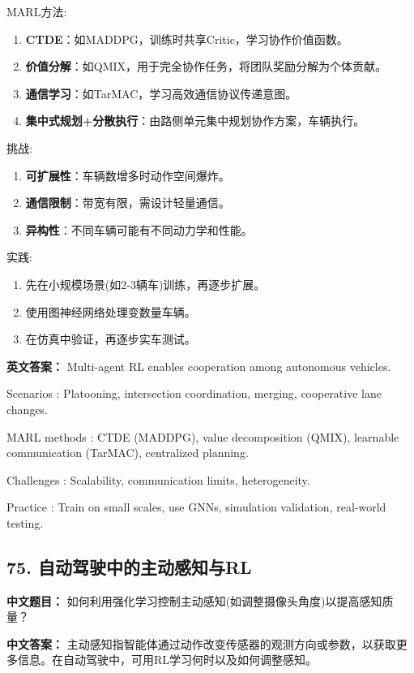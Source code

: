 \documentclass[10pt,a4paper]{ctexart}
\begin{document}
 MARL方法:
\begin{enumerate}
    \item \textbf{CTDE}：如MADDPG，训练时共享Critic，学习协作价值函数。
    \item \textbf{价值分解}：如QMIX，用于完全协作任务，将团队奖励分解为个体贡献。
    \item \textbf{通信学习}：如TarMAC，学习高效通信协议传递意图。
    \item \textbf{集中式规划+分散执行}：由路侧单元集中规划协作方案，车辆执行。
\end{enumerate}

 挑战:
\begin{enumerate}
    \item \textbf{可扩展性}：车辆数增多时动作空间爆炸。
    \item \textbf{通信限制}：带宽有限，需设计轻量通信。
    \item \textbf{异构性}：不同车辆可能有不同动力学和性能。
\end{enumerate}

 实践:
\begin{enumerate}
    \item 先在小规模场景(如2-3辆车)训练，再逐步扩展。
    \item 使用图神经网络处理变数量车辆。
    \item 在仿真中验证，再逐步实车测试。
\end{enumerate}

\textbf{英文答案：}  
Multi-agent RL enables cooperation among autonomous vehicles.

 Scenarios : Platooning, intersection coordination, merging, cooperative lane changes.

 MARL methods : CTDE (MADDPG), value decomposition (QMIX), learnable communication (TarMAC), centralized planning.

 Challenges : Scalability, communication limits, heterogeneity.

 Practice : Train on small scales, use GNNs, simulation validation, real-world testing.

\subsection*{75. 自动驾驶中的主动感知与RL}
\textbf{中文题目：} 如何利用强化学习控制主动感知(如调整摄像头角度)以提高感知质量？

\textbf{中文答案：}  
主动感知指智能体通过动作改变传感器的观测方向或参数，以获取更多信息。在自动驾驶中，可用RL学习何时以及如何调整感知。
\end{document}
